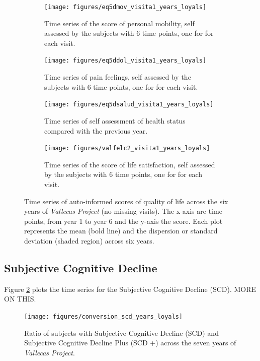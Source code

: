 \documentclass[11pt]{article}
\theoremstyle{definition}
\theoremstyle{remark}
\begin{document}
\begin{figure}[!htb]
    \centering
    \begin{subfigure}[t]{0.45\textwidth}
        \centering
        \texttt{[image: figures/eq5dmov\_visita1\_years\_loyals]}
        \caption{Time series of the score of personal mobility, self assessed by the subjects with 6 time points, one for for each visit.}
    \end{subfigure}
    \hfill 
    \begin{subfigure}[t]{0.45\textwidth}
        \centering
        \texttt{[image: figures/eq5ddol\_visita1\_years\_loyals]}
        \caption{Time series of pain feelings, self assessed by the subjects with 6 time points, one for for each visit.}
    \end{subfigure}%
    
     \begin{subfigure}[t]{0.45\textwidth}
        \centering
        \texttt{[image: figures/eq5dsalud\_visita1\_years\_loyals]}
        \caption{Time series of self assessment of health status compared with the previous year.}
    \end{subfigure}
    \hfill
    \begin{subfigure}[t]{0.45\textwidth}
        \centering
        \texttt{[image: figures/valfelc2\_visita1\_years\_loyals]}
        \caption{Time series of the score of life satisfaction, self assessed by the subjects with 6 time points, one for for each visit.}
    \end{subfigure}%
    \caption{Time series of auto-informed scores of quality of life across the six years of \emph{Vallecas Project} (no missing visits). The x-axis are time points, from year 1 to year 6 and the y-axis the score. Each plot represents the mean (bold line) and the dispersion or standard deviation (shaded region) across six years.}
    \label{fig:qol4}
\end{figure}

\subsection{Subjective Cognitive Decline}
\label{sse:scd}
Figure \ref{fig:diag1} plots the time series for the Subjective Cognitive Decline (SCD). 
MORE ON THIS.

\begin{figure}[!htb]
        \centering
        \texttt{[image: figures/conversion\_scd\_years\_loyals]}
        \caption{Ratio of subjects with Subjective Cognitive Decline (SCD) and Subjective Cognitive Decline Plus (SCD +) across the seven years of \emph{Vallecas Project}.} 
        \label{fig:diag1}
\end{figure}
\end{document}
